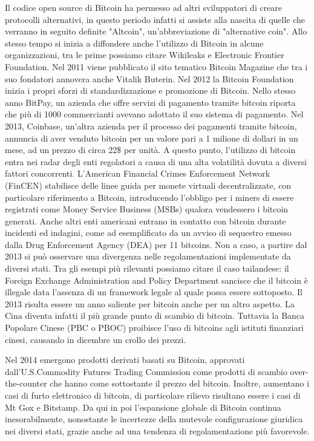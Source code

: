 Il codice open source di Bitcoin ha permesso ad altri sviluppatori di creare protocolli alternativi\cite{K16}, in questo periodo infatti si assiste alla nascita di quelle che verranno in seguito definite "Altcoin", un'abbreviazione di "alternative coin". Allo stesso tempo si inizia a diffondere anche l'utilizzo di Bitcoin in alcune organizzazioni, tra le prime possiamo citare Wikileaks e Electronic Frontier Foundation. Nel 2011 viene pubblicato il sito tematico Bitcoin Magazine che tra i suo fondatori annovera anche Vitalik Buterin. Nel 2012 la Bitcoin Foundation inizia i propri sforzi di standardizzazione e promozione di Bitcoin. Nello stesso anno BitPay, un azienda che offre servizi di pagamento tramite bitcoin riporta che più di 1000 commercianti avevano adottato il suo sistema di pagamento. Nel 2013, Coinbase, un'altra azienda per il processo dei pagamenti tramite bitcoin, annuncia di aver venduto bitcoin per un valore pari a 1 milione di dollari in un mese, ad un prezzo di circa 22\$ per unità. 
A questo punto, l'utilizzo di bitcoin entra nei radar degli enti regolatori a causa di una alta volatilità dovuta a diversi fattori concorrenti. L'American Financial Crimes Enforcement Network (FinCEN) stabilisce delle linee guida per monete virtuali decentralizzate, con particolare riferimento a Bitcoin, introducendo l'obbligo per i miners di essere registrati come Money Service Business (MSBs) qualora vendessero i bitcoin generati\cite{K17}. Anche altri enti americani entrano in contatto con bitcoin durante incidenti ed indagini, come ad esemplificato da un avviso di sequestro emesso dalla Drug Enforcement Agency (DEA) per 11 bitcoins. Non a caso, a partire dal 2013 si può osservare una divergenza nelle regolamentazioni implementate da diversi stati. 
Tra gli esempi più rilevanti possiamo citare il caso tailandese: il Foreign Exchange Administration and Policy Department sancisce che il bitcoin è illegale data l'assenza di un framework legale al quale possa essere sottoposto\cite{K18}. Il 2013 risulta essere un anno saliente per bitcoin anche per un altro aspetto. La Cina diventa infatti il più grande punto di scambio di bitcoin. Tuttavia la Banca Popolare Cinese (PBC o PBOC) proibisce l'uso di bitcoins agli istituti finanziari cinesi, causando in dicembre un crollo dei prezzi\cite{K19}. 

Nel 2014 emergono prodotti derivati basati su Bitcoin, approvati dall'U.S.Commodity Futures Trading Commission come prodotti di scambio over-the-counter che hanno come sottostante il prezzo del bitcoin. Inoltre, aumentano i casi di furto elettronico di bitcoin, di particolare rilievo risultano essere i casi di Mt Gox e Bitstamp. 
Da qui in poi l'espansione globale di Bitcoin continua inesorabilmente, nonostante le incertezze della mutevole configurazione giuridica nei diversi stati, grazie anche ad una tendenza di regolamentazione più favorevole.  

